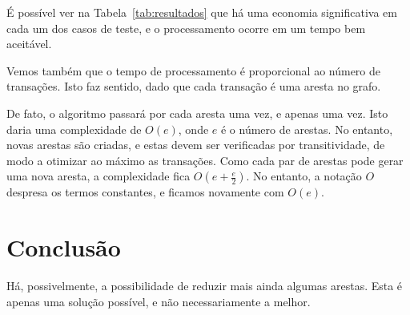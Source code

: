 \documentclass[12pt]{article}
\begin{document}

É possível ver na Tabela~\ref{tab:resultados} que há uma economia significativa
em cada um dos casos de teste, e o processamento ocorre em um tempo bem aceitável.

Vemos também que o tempo de processamento é proporcional ao número de
transações. Isto faz sentido, dado que cada transação é uma aresta no grafo.

De fato, o algoritmo passará por cada aresta uma vez, e apenas uma vez. Isto
daria uma complexidade de $O(e)$, onde $e$ é o número de arestas. No entanto,
novas arestas são criadas, e estas devem ser verificadas por transitividade, de
modo a otimizar ao máximo as transações. Como cada par de arestas pode gerar uma
nova aresta, a complexidade fica $O(e + \frac{e}{2})$. No entanto, a notação $O$
despresa os termos constantes, e ficamos novamente com $O(e)$.

\section{Conclusão}\label{sec:conclusao}

Há, possivelmente, a possibilidade de reduzir mais ainda algumas arestas. Esta é
apenas uma solução possível, e não necessariamente a melhor.
\end{document}
